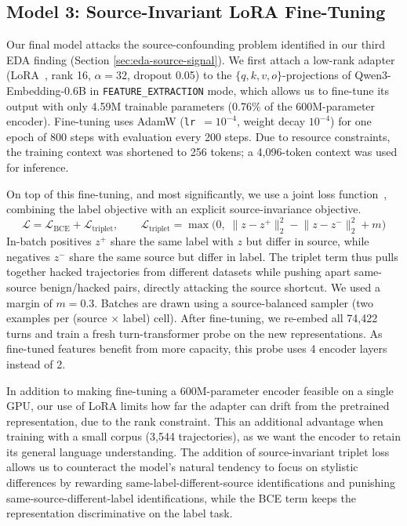 \documentclass{article}
\begin{document}
\subsection{Model 3: Source-Invariant LoRA Fine-Tuning}
\label{sec:lora}

Our final model attacks the source-confounding problem identified in our third EDA finding (Section \ref{sec:eda-source-signal}). We first attach a low-rank adapter (LoRA~\cite{lora2021}, rank 16, $\alpha = 32$, dropout 0.05) to the $\{q, k, v, o\}$-projections of Qwen3-Embedding-0.6B in \texttt{FEATURE\_EXTRACTION} mode, which allows us to fine-tune its output with only 4.59M trainable parameters (0.76\% of the 600M-parameter encoder). Fine-tuning uses AdamW (\texttt{lr}~$=10^{-4}$, weight decay $10^{-4}$) for one epoch of 800 steps with evaluation every 200 steps. Due to resource constraints, the training context was shortened to 256 tokens; a 4{,}096-token context was used for inference.

On top of this fine-tuning, and most significantly, we use a joint loss function~\cite{ai-assist}, combining the label objective with an explicit source-invariance objective.
\begin{equation}
\mathcal{L} = \mathcal{L}_{\text{BCE}} + \mathcal{L}_{\text{triplet}}, \qquad
\mathcal{L}_{\text{triplet}} = \max\bigl(0,\; \lVert z - z^{+} \rVert_2^2 - \lVert z - z^{-} \rVert_2^2 + m\bigr)
\label{eq:loss}
\end{equation}
In-batch positives $z^{+}$ share the same label with $z$ but differ in source, while negatives $z^{-}$ share the same source but differ in label. The triplet term thus pulls together hacked trajectories from different datasets while pushing apart same-source benign/hacked pairs, directly attacking the source shortcut. We used a margin of $m = 0.3$. Batches are drawn using a source-balanced sampler (two examples per (source $\times$ label) cell). After fine-tuning, we re-embed all 74{,}422 turns and train a fresh turn-transformer probe on the new representations. As fine-tuned features benefit from more capacity, this probe uses 4 encoder layers instead of 2.

In addition to making fine-tuning a 600M-parameter encoder feasible on a single GPU, our use of LoRA limits how far the adapter can drift from the pretrained representation, due to the rank constraint. This an additional advantage when training with a small corpus (3{,}544 trajectories), as we want the encoder to retain its general language understanding. The addition of source-invariant triplet loss allows us to counteract the model's natural tendency to focus on stylistic differences by rewarding same-label-different-source identifications and punishing same-source-different-label identifications, while the BCE term keeps the representation discriminative on the label task.
\end{document}
